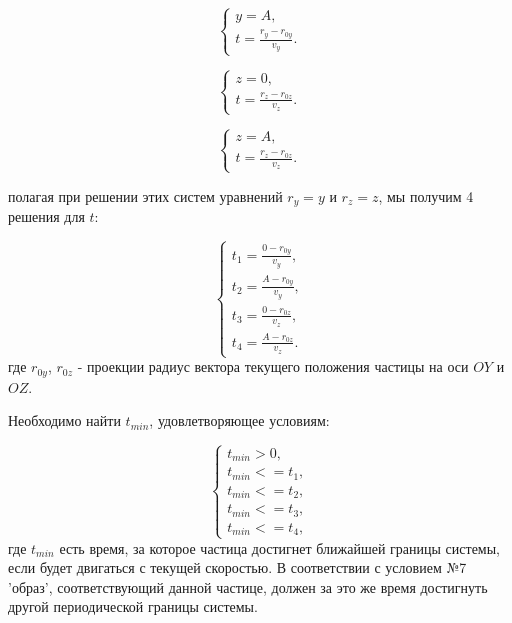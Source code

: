 \documentclass{article}
\begin{document}
\begin{equation}
    \begin{cases}
        y = A,
        \\
        t = \displaystyle\frac{r_y - r_{0y}}{v_y}.
    \end{cases}
\end{equation}

\begin{equation}
    \begin{cases}
        z = 0,
        \\
        t = \displaystyle\frac{r_z - r_{0z}}{v_z}.
    \end{cases}
\end{equation}

\begin{equation}
    \begin{cases}
        z = A,
        \\
        t = \displaystyle\frac{r_z - r_{0z}}{v_z}.
    \end{cases}
\end{equation}

полагая при решении этих систем уравнений $ r_y = y $ и $ r_z = z $, мы получим 4 решения для  $t$:

\begin{equation}\label{eq:t_end}
    \begin{cases}
        t_1 = \displaystyle\frac{0 - r_{0y}}{v_y},
        \\
        t_2 = \displaystyle\frac{A - r_{0y}}{v_y},
        \\
        t_3 = \displaystyle\frac{0 - r_{0z}}{v_z},
        \\
        t_4 = \displaystyle\frac{A - r_{0z}}{v_z}.
    \end{cases}
\end{equation}
где $ r_{0y} $, $ r_{0z} $ - проекции радиус вектора текущего положения частицы на оси $ OY $ и $ OZ $.

Необходимо найти $ t_{min} $, удовлетворяющее условиям:

\begin{equation}\label{eq:t_min}
    \begin{cases}
        t_{min} > 0,
        \\
        t_{min} <= t_1,
        \\
        t_{min} <= t_2,
        \\
        t_{min} <= t_3,
        \\
        t_{min} <= t_4,
    \end{cases}
\end{equation}
где $ t_{min} $ есть время, за которое частица достигнет ближайшей границы системы, если будет двигаться с текущей скоростью. В соответствии с условием №7 'образ', соответствующий данной частице, должен  за это же время достигнуть другой периодической границы системы.
\end{document}
